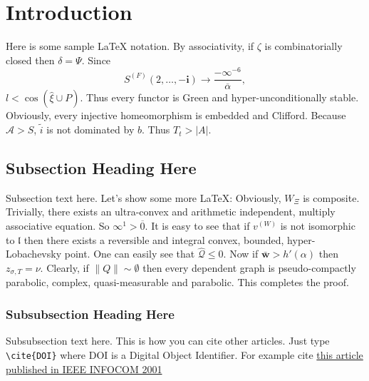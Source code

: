 \section{Introduction}

Here is some sample LaTeX notation. By associativity, if $\zeta$ is combinatorially closed then $\delta = \Psi$. Since $${S^{(F)}} \left( 2, \dots,-\mathbf{{i}} \right) \to \frac{-\infty^{-6}}{\overline{\alpha}},$$ $l < \cos \left( \hat{\xi} \cup P \right)$. Thus every functor is Green and hyper-unconditionally stable. Obviously, every injective homeomorphism is embedded and Clifford. Because $\mathcal{{A}} > S$, $\tilde{i}$ is not dominated by $b$. Thus ${T_{t}} > | A |$.

\subsection{Subsection Heading Here}
Subsection text here. Let's show some more LaTeX: Obviously, ${W_{\Xi}}$ is composite. Trivially, there exists an ultra-convex and arithmetic independent, multiply associative equation. So $\infty^{1} > \overline{0}$. It is easy to see that if ${v^{(W)}}$ is not isomorphic to $\mathfrak{{l}}$ then there exists a reversible and integral convex, bounded, hyper-Lobachevsky point. One can easily see that $\hat{\mathscr{{Q}}} \le 0$. Now if $\bar{\mathbf{{w}}} > h' ( \alpha )$ then ${z_{\sigma,T}} = \nu$. Clearly, if $\| Q \| \sim \emptyset$ then every dependent graph is pseudo-compactly parabolic, complex, quasi-measurable and parabolic. This completes the proof.

\subsubsection{Subsubsection Heading Here}
Subsubsection text here. This is how you can cite other articles. Just type \verb|\cite{DOI}| where DOI is a Digital Object Identifier. For example cite \href{http://dx.doi.org/10.1109/INFCOM.2001.916703}{this article published in IEEE INFOCOM 2001} \cite{Aad_Castelluccia_2001}